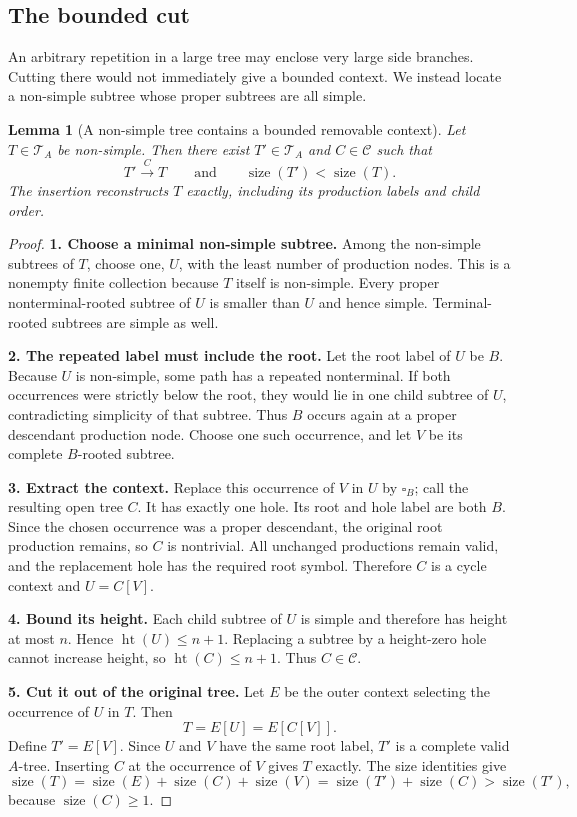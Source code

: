 \documentclass[11pt,a4paper]{article}
\numberwithin{equation}{section}
\theoremstyle{plain}
\newtheorem{lemma}[theorem]{Lemma}
\theoremstyle{definition}
\theoremstyle{remark}
\newcommand{\treeheight}{\operatorname{ht}}
\newcommand{\sz}{\operatorname{size}}
\newcommand{\Trees}{\mathcal T}
\newcommand{\Cycles}{\mathcal C}
\newcommand{\hole}[1]{\square_{#1}}
\newcommand{\ins}[1]{\xrightarrow{\;#1\;}}
\begin{document}
\subsection{The bounded cut}
An arbitrary repetition in a large tree may enclose very large side branches. Cutting there would not immediately give a bounded context. We instead locate a non-simple subtree whose proper subtrees are all simple.

\begin{lemma}[A non-simple tree contains a bounded removable context]\label{lem:cut}
Let $T\in\Trees_A$ be non-simple. Then there exist $T'\in\Trees_A$ and $C\in\Cycles$ such that
\[
T'\ins C T\qquad\text{and}\qquad\sz(T')<\sz(T).
\]
The insertion reconstructs $T$ exactly, including its production labels and child order.
\end{lemma}
\begin{proof}
\textbf{1. Choose a minimal non-simple subtree.}
Among the non-simple subtrees of $T$, choose one, $U$, with the least number of production nodes. This is a nonempty finite collection because $T$ itself is non-simple. Every proper nonterminal-rooted subtree of $U$ is smaller than $U$ and hence simple. Terminal-rooted subtrees are simple as well.

\textbf{2. The repeated label must include the root.}
Let the root label of $U$ be $B$. Because $U$ is non-simple, some path has a repeated nonterminal. If both occurrences were strictly below the root, they would lie in one child subtree of $U$, contradicting simplicity of that subtree. Thus $B$ occurs again at a proper descendant production node. Choose one such occurrence, and let $V$ be its complete $B$-rooted subtree.

\textbf{3. Extract the context.}
Replace this occurrence of $V$ in $U$ by $\hole{B}$; call the resulting open tree $C$. It has exactly one hole. Its root and hole label are both $B$. Since the chosen occurrence was a proper descendant, the original root production remains, so $C$ is nontrivial. All unchanged productions remain valid, and the replacement hole has the required root symbol. Therefore $C$ is a cycle context and $U=C[V]$.

\textbf{4. Bound its height.}
Each child subtree of $U$ is simple and therefore has height at most $n$. Hence $\treeheight(U)\leq n+1$. Replacing a subtree by a height-zero hole cannot increase height, so $\treeheight(C)\leq n+1$. Thus $C\in\Cycles$.

\textbf{5. Cut it out of the original tree.}
Let $E$ be the outer context selecting the occurrence of $U$ in $T$. Then
\[
T=E[U]=E[C[V]].
\]
Define $T'=E[V]$. Since $U$ and $V$ have the same root label, $T'$ is a complete valid $A$-tree. Inserting $C$ at the occurrence of $V$ gives $T$ exactly. The size identities give
\[
\sz(T)=\sz(E)+\sz(C)+\sz(V)
         =\sz(T')+\sz(C)>\sz(T'),
\]
because $\sz(C)\geq1$.
\end{proof}
\end{document}
